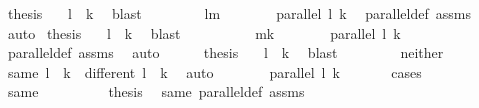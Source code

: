 \begin{isabellebody}
\ {\isacharquery}{\kern0pt}thesis\ \ \isamarkupfalse%
\ {\isacartoucheopen}l\ {\isacharbar}{\kern0pt}{\isacharbar}{\kern0pt}\ k{\isacartoucheclose}\ \isamarkupfalse%
\ blast\isanewline
\ \ \isamarkupfalse%
\isanewline
\ \ \ \ \isamarkupfalse%
\ lm\isanewline
\ \ \ \ \isamarkupfalse%
\ \isamarkupfalse%
\ {\isachardoublequoteopen}parallel\ l\ k{\isachardoublequoteclose}\ \isamarkupfalse%
\ parallel{\isacharunderscore}{\kern0pt}def\ assms\ \isamarkupfalse%
\ auto\isanewline
{}\isamarkupfalse%
\ {\isacharquery}{\kern0pt}thesis\ \ \isamarkupfalse%
\ {\isacartoucheopen}l\ {\isacharbar}{\kern0pt}{\isacharbar}{\kern0pt}\ k{\isacartoucheclose}\ \isamarkupfalse%
\ blast\isanewline
\ \ \isamarkupfalse%
\ \isanewline
\ \ \ \ \isamarkupfalse%
\ mk\isanewline
\ \ \ \ \isamarkupfalse%
\ \isamarkupfalse%
\ {\isachardoublequoteopen}parallel\ l\ k{\isachardoublequoteclose}\ \isamarkupfalse%
\ parallel{\isacharunderscore}{\kern0pt}def\ assms\ \isamarkupfalse%
\ auto\isanewline
\ \ \ \ \isamarkupfalse%
\ {\isacharquery}{\kern0pt}thesis\ \ \isamarkupfalse%
\ {\isacartoucheopen}l\ {\isacharbar}{\kern0pt}{\isacharbar}{\kern0pt}\ k{\isacartoucheclose}\ \isamarkupfalse%
\ blast\isanewline
\ \ \isamarkupfalse%
\isanewline
\ \ \ \ \isamarkupfalse%
\ neither\isanewline
\ \ \ \ \isamarkupfalse%
\ {\isacharparenleft}{\kern0pt}same{\isacharparenright}{\kern0pt}\ {\isachardoublequoteopen}l\ {\isacharequal}{\kern0pt}\ k{\isachardoublequoteclose}\ {\isacharbar}{\kern0pt}\ {\isacharparenleft}{\kern0pt}different{\isacharparenright}{\kern0pt}\ {\isachardoublequoteopen}l\ {\isasymnoteq}\ k{\isachardoublequoteclose}\ \isamarkupfalse%
\ auto\isanewline
\ \ \ \ \isamarkupfalse%
\ \isamarkupfalse%
\ {\isachardoublequoteopen}parallel\ l\ k{\isachardoublequoteclose}\ \isanewline
\ \ \ \ \isamarkupfalse%
\ cases\isanewline
\ \ \ \ \ \ \isamarkupfalse%
\ same\isanewline
\ \ \ \ \ \ \isamarkupfalse%
\ \isamarkupfalse%
\ {\isacharquery}{\kern0pt}thesis\ \isamarkupfalse%
\ same\ parallel{\isacharunderscore}{\kern0pt}def\ assms\ \isamarkupfalse%

\end{isabellebody}
